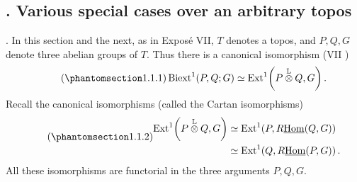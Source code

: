 
\subsection*{. Various special cases over an arbitrary topos}

. In this section and the next, as in Expos\'e VII, $T$ denotes a
topos, and $P,Q,G$ denote three abelian groups of $T$.  Thus there is a
canonical isomorphism (VII )
\begin{equation}\tag{\SGARefTarget{sga7.sga7i.eviii.n1-1-1}{1.1.1}}
 \Biext^1(P,Q;G)
 \simeq
 \Ext^1\!\left(P\mathbin{\overset{\mathbb L}{\otimes}}Q,G\right).
\end{equation}
Recall the canonical isomorphisms (called the Cartan isomorphisms)
\begin{equation}\tag{\SGARefTarget{sga7.sga7i.eviii.n1-1-2}{1.1.2}}
\begin{split}
 \Ext^1\!\left(P\mathbin{\overset{\mathbb L}{\otimes}}Q,G\right)
 &\simeq \Ext^1\!\left(P,R\uHom(Q,G)\right)\\
 &\simeq \Ext^1\!\left(Q,R\uHom(P,G)\right).
\end{split}
\end{equation}
All these isomorphisms are functorial in the three arguments $P,Q,G$.

